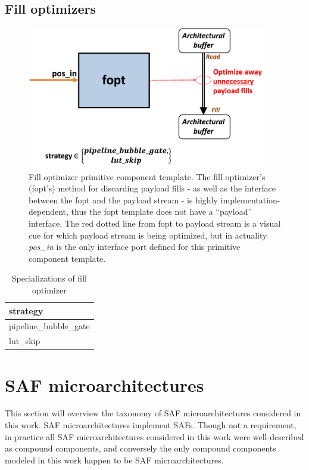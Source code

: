 \subsection{Fill optimizers}

\begin{figure}[H]
    \centering
    \includegraphics[width=0.95\textwidth]{figures/fopt.png}
    \caption{Fill optimizer primitive component template. The fill optimizer's (fopt's) method for discarding payload fills - as well as the interface between the fopt and the payload stream - is highly implementation-dependent, thus the fopt template does not have a ``payload'' interface. The red dotted line from fopt to payload stream is a visual cue for which payload stream is being optimized, but in actuality \textit{pos\_in} is the only interface port defined for this primitive component template.}
    \label{fig:fopt}
\end{figure}

\begin{table}[H]
\centering
\begin{tabular}{l}
\toprule
 strategy             \\
\midrule
 pipeline\_bubble\_gate \\
 lut\_skip             \\
\bottomrule
\end{tabular}
\caption{Specializations of fill optimizer}
\label{tab:FillOptimizer_specializations}
\end{table}

\section{SAF microarchitectures}

This section will overview the taxonomy of SAF microarchitectures considered in this work. SAF microarchitectures implement SAFs. Though not a requirement, in practice all SAF microarchitectures considered in this work were well-described as compound components, and conversely the only compound components modeled in this work happen to be SAF microarchitectures.

